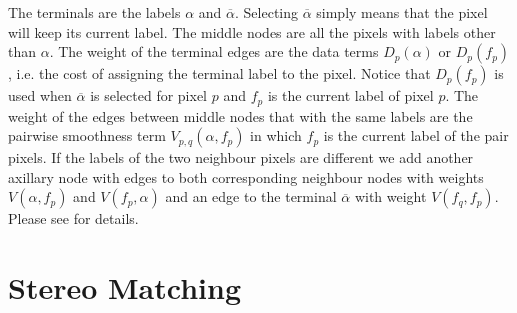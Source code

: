 \documentclass[letterpaper, 10 pt, conference]{ieeeconf}  %
\begin{document}
The terminals are the labels $\alpha$ and $\overline{\alpha}$. Selecting $\overline{\alpha}$ simply means that the pixel will keep its current label. The middle nodes are all the pixels with labels other than $\alpha$. The weight of the terminal edges are the data terms $D_p(\alpha)$ or $D_p(f_p)$, i.e. the cost of assigning the terminal label to the pixel. Notice that $D_p(f_p)$ is used when $\overline{\alpha}$ is selected for pixel $p$ and $f_p$ is the current label of pixel $p$. The weight of the edges between middle nodes that with the same labels are the pairwise smoothness term $V_{p,q}(\alpha,f_p)$ in which $f_p$ is the current label of the pair pixels. If the labels of the two neighbour pixels are different we add another axillary node with edges to both corresponding neighbour nodes with weights $V(\alpha,f_p)$ and $V(f_p, \alpha)$ and an edge to the terminal $\overline{\alpha}$ with weight $V(f_q,f_p)$. Please see \cite{boykov2001fast} for details.

\section{Stereo Matching}
\end{document}
